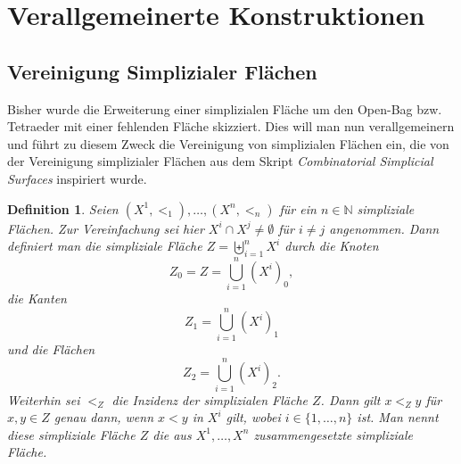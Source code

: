 \documentclass[12pt,titlepage,twoside,cleardoublepage]{article}
\theoremstyle{nummermitklammern}
\newtheorem{definition}[temp]{Definition}
\newtheorem{definition}[zahl]{Definition}
\numberwithin{equation}{section}
\begin{document}
\section{Verallgemeinerte Konstruktionen}
\subsection{Vereinigung Simplizialer Flächen} 
Bisher wurde die Erweiterung einer simplizialen Fläche um den Open-Bag bzw. Tetraeder mit einer fehlenden Fläche skizziert. Dies will man nun verallgemeinern und führt zu diesem Zweck die Vereinigung von simplizialen Flächen ein, die von der Vereinigung simplizialer Flächen aus dem Skript \emph{Combinatorial Simplicial Surfaces} inspiriert wurde.
\begin{definition} Seien $(X^1,<_1), \ldots,(X^n,<_n)$ für ein $n \in \mathbb{N}$ simpliziale Flächen. Zur Vereinfachung sei hier $X^i\cap X^j\neq \emptyset$ für $i \neq j$ angenommen. Dann definiert man die simpliziale Fläche $Z=\biguplus\limits_{i=1}^{n} X^i$ durch
die Knoten 
\[
Z_0= Z=\bigcup\limits_{i=1}^{n} (X^i)_0,
\]
die Kanten 
\[
Z_1=\bigcup\limits_{i=1}^{n} (X^i)_1
\]
und die Flächen 
\[
Z_2=\bigcup\limits_{i=1}^{n} (X^i)_2.
\]
Weiterhin sei $<_Z$ die Inzidenz der simplizialen Fläche $Z$. Dann gilt $x<_{Z} y$ für $x,y \in Z$ genau dann, wenn $x<y$ in $X^i$ gilt, wobei $i \in \{1,\ldots,n\}$ ist. Man nennt diese simpliziale Fläche $Z$ die \emph{aus $X^1,\ldots,X^n$ zusammengesetzte simpliziale Fläche}.
\end{definition}
\end{document}
